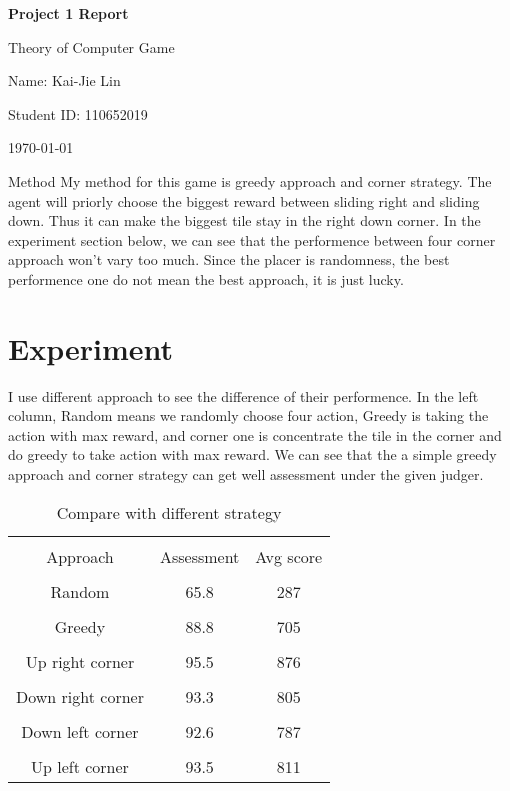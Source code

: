 \documentclass{article} %
\newcommand{\question}[2][]{\begin{flushleft}\textbf{Question #1}: \textit{#2}\end{flushleft}}
\newcommand{\maketitletwo}[2][]{\begin{center}
        \Large{\textbf{Project 1 Report}
        
            Theory of Computer Game} %
        \vspace{5pt}
        
        \normalsize{
            Name: Kai-Jie Lin 
            
            Student ID: 110652019
            
            \today}
        \vspace{15pt}
        \end{center}}
\begin{document}
    \maketitletwo[5]  %
    
    \section{Method} 
    My method for this game is greedy approach and corner strategy. The agent will priorly choose the biggest reward between sliding right and sliding down.
    Thus it can make the biggest tile stay in the right down corner. 
    In the experiment section below, we can see that the performence between four corner approach won't vary too much. Since the placer is randomness, the best performence one do not mean the best approach, it is just lucky.

    \section{Experiment}
    I use different approach to see the difference of their performence.
    In the left column, Random means we randomly choose four action, Greedy is taking the action with max reward, and corner one is concentrate the tile in the corner and do greedy to take action with max reward. 
    We can see that the a simple greedy approach and corner strategy can get well assessment under the given judger.
    \begin{table}[htbp]
        \centering 
        \caption{Compare with different strategy}
        \begin{tabular}{|c|c|c|}
            \hline
            & & \\ [-6pt]
            Approach & Assessment & Avg score  \\
            \hline
            & & \\ [-6pt]
            Random   & 65.8       & 287 \\
            \hline
            & & \\ [-6pt]
            Greedy   & 88.8       & 705 \\
            \hline
            & & \\ [-6pt]
            Up right corner & 95.5 & 876  \\
            \hline
            & & \\ [-6pt]
            Down right corner & 93.3 & 805 \\
            \hline
            & & \\ [-6pt]
            Down left corner & 92.6 & 787 \\
            \hline
            & & \\ [-6pt]
            Up left corner & 93.5 & 811 \\
            \hline
        \end{tabular}
    \end{table}
\end{document}
